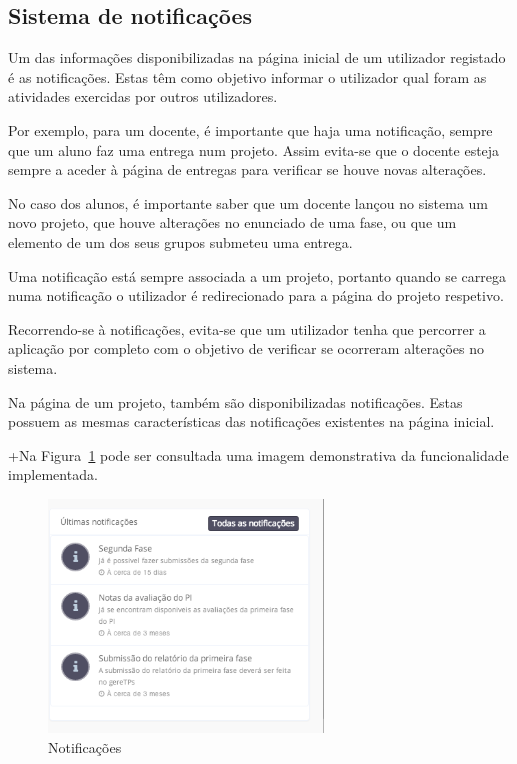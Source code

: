 \subsection{Sistema de notificações}

Um das informações disponibilizadas na página inicial de um utilizador registado é as notificações. Estas têm como objetivo informar o utilizador qual foram as atividades exercidas por outros utilizadores.

Por exemplo, para um docente, é importante que haja uma notificação, sempre que um aluno faz uma entrega num projeto. Assim evita-se que o docente esteja sempre a aceder à página de entregas para verificar se houve novas alterações.

No caso dos alunos, é importante saber que um docente lançou no sistema um novo projeto, que houve alterações no enunciado de uma fase, ou que um elemento de um dos seus grupos submeteu uma entrega.

Uma notificação está sempre associada a um projeto, portanto quando se carrega numa notificação o utilizador é redirecionado para a página do projeto respetivo.

Recorrendo-se à notificações, evita-se que um utilizador tenha que percorrer a aplicação por completo com o objetivo de verificar se ocorreram alterações no sistema.

Na página de um projeto, também são disponibilizadas notificações. Estas possuem as mesmas características das notificações existentes na página inicial.

+Na Figura~\ref{fig:notifications} pode ser consultada uma imagem demonstrativa da funcionalidade implementada.

\begin{figure}[H]
  \centering
  \includegraphics[width=0.65\textwidth,center]{images/implementacao/alunos/notifications}
  \caption{Notificações}
  \label{fig:notifications}
\end{figure}
